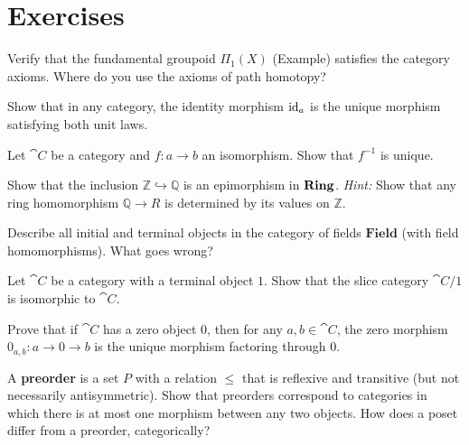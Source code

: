 \section{Exercises}

\begin{exercise}
Verify that the fundamental groupoid $\Pi_1(X)$ (Example) satisfies the category axioms. Where do you use the axioms of path homotopy?
\end{exercise}

\begin{exercise}
Show that in any category, the identity morphism $\mathrm{id}_a$ is the unique morphism satisfying both unit laws.
\end{exercise}

\begin{exercise}
Let $\cat{C}$ be a category and $f: a \to b$ an isomorphism. Show that $f^{-1}$ is unique.
\end{exercise}

\begin{exercise}
Show that the inclusion $\mathbb{Z} \hookrightarrow \mathbb{Q}$ is an epimorphism in $\mathbf{Ring}$. \emph{Hint:} Show that any ring homomorphism $\mathbb{Q} \to R$ is determined by its values on $\mathbb{Z}$.
\end{exercise}

\begin{exercise}
Describe all initial and terminal objects in the category of fields $\mathbf{Field}$ (with field homomorphisms). What goes wrong?
\end{exercise}

\begin{exercise}
Let $\cat{C}$ be a category with a terminal object $1$. Show that the slice category $\cat{C}/1$ is isomorphic to $\cat{C}$.
\end{exercise}

\begin{exercise}
Prove that if $\cat{C}$ has a zero object $0$, then for any $a,b \in \cat{C}$, the zero morphism $0_{a,b}: a \to 0 \to b$ is the unique morphism factoring through $0$.
\end{exercise}

\begin{exercise}[$\star$]
A \textbf{preorder} is a set $P$ with a relation $\leq$ that is reflexive and transitive (but not necessarily antisymmetric). Show that preorders correspond to categories in which there is at most one morphism between any two objects. How does a poset differ from a preorder, categorically?
\end{exercise}


